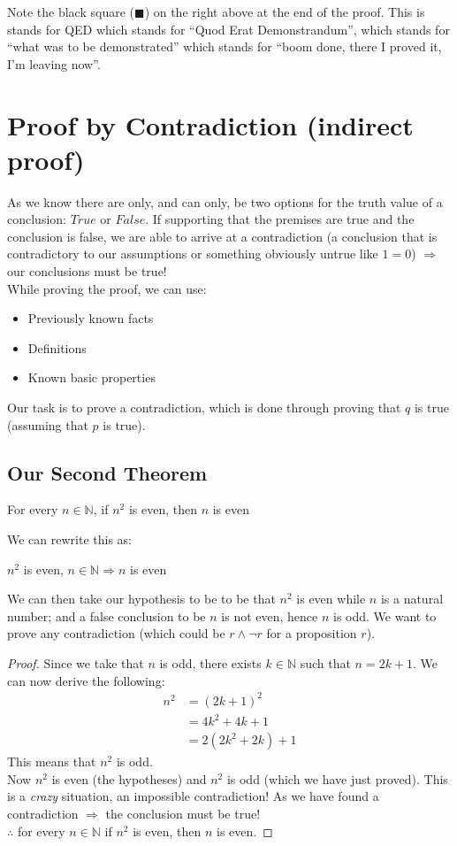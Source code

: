 Note the black square ($\blacksquare$) on the right above at the end of the proof. This is stands for QED which stands for ``Quod Erat Demonstrandum'', which stands for ``what was to be demonstrated'' which stands for ``boom done, there I proved it, I'm leaving now''. 

\section{Proof by Contradiction (indirect proof)}
As we know there are only, and can only, be two options for the truth value of a conclusion: $True$ or $False$. If supporting that the premises are true and the conclusion is false, we are able to arrive at a contradiction (a conclusion that is contradictory to our assumptions or something obviously untrue like $1=0$) $\Rightarrow$ our conclusions must be true!\\

While proving the proof, we can use:
\begin{itemize}
    \item Previously known facts
    \item Definitions
    \item Known basic properties
\end{itemize}

Our task is to prove a contradiction, which is done through proving that $q$ is true (assuming that $p$ is true).

\subsection{Our Second Theorem}
\begin{theorem}
    For every $n \in \mathbb{N}$, if $n^2$ is even, then $n$ is even
\end{theorem}
We can rewrite this as:
\begin{center}
    $n^2$ is even, $n \in \mathbb{N} \Rightarrow n$ is even 
\end{center}
We can then take our hypothesis to be to be that $n^2$ is even while $n$ is a natural number; and a false conclusion to be $n$ is not even, hence $n$ is odd. We want to prove any contradiction (which could be $r \wedge \neg r$ for a proposition $r$). 

\begin{proof}
Since we take that $n$ is odd, there exists $k \in \mathbb{N}$ such that $n=2k+1$. We can now derive the following:
\begin{align*}
    n^2 &= (2k+1)^2\\
    &= 4k^2 + 4k + 1\\
    &= 2(2k^2+2k) + 1
\end{align*}
This means that $n^2$ is odd.\\

Now $n^2$ is even (the hypotheses) and $n^2$ is odd (which we have just proved). This is a \textit{crazy} situation, an impossible contradiction! As we have found a contradiction $\Rightarrow$ the conclusion must be true!\\

$\therefore$ for every $n \in \mathbb{N}$ if $n^2$ is even, then $n$ is even.
\end{proof}

